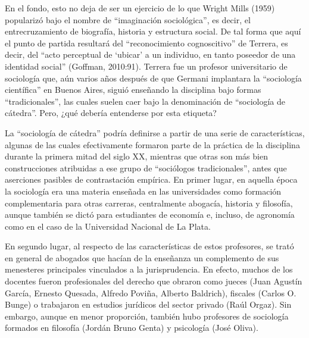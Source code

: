 En el fondo, esto no deja de ser un ejercicio de lo que Wright Mills (1959) popularizó bajo el nombre de ``imaginación sociológica'', es decir, el entrecruzamiento de biografía, historia y estructura social. De tal forma que aquí el punto de partida resultará del ``reconocimiento cognoscitivo'' de Terrera, es decir, del ``acto perceptual de `ubicar' a un individuo, en tanto poseedor de una identidad social'' (Goffman, 2010:91). Terrera fue un profesor universitario de sociología que, aún varios años después de que Germani implantara la ``sociología científica'' en Buenos Aires, siguió enseñando la disciplina bajo formas ``tradicionales'', las cuales suelen caer bajo la denominación de ``sociología de cátedra''. Pero, ¿qué debería entenderse por esta etiqueta?

La ``sociología de cátedra'' podría definirse a partir de una serie de características, algunas de las cuales efectivamente formaron parte de la práctica de la disciplina durante la primera mitad del siglo XX, mientras que otras son más bien construcciones atribuidas a ese grupo de ``sociólogos tradicionales'', antes que aserciones pasibles de contrastación empírica. En primer lugar, en aquella época la sociología era una materia enseñada en las universidades como formación complementaria para otras carreras, centralmente abogacía, historia y filosofía, aunque también se dictó para estudiantes de economía e, incluso, de agronomía como en el caso de la Universidad Nacional de La Plata.

En segundo lugar, al respecto de las características de estos profesores, se trató en general de abogados que hacían de la enseñanza un complemento de sus menesteres principales vinculados a la jurisprudencia. En efecto, muchos de los docentes fueron profesionales del derecho que obraron como jueces (Juan Agustín García, Ernesto Quesada, Alfredo Poviña, Alberto Baldrich), fiscales (Carlos O. Bunge) o trabajaron en estudios jurídicos del sector privado (Raúl Orgaz). Sin embargo, aunque en menor proporción, también hubo profesores de sociología formados en filosofía (Jordán Bruno Genta) y psicología (José Oliva).

